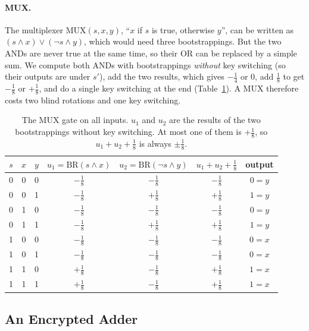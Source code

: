 \documentclass[12pt]{article}
\theoremstyle{plain}
\theoremstyle{definition}
\begin{document}


\paragraph{MUX.}
The multiplexer $\mathrm{MUX}(s,x,y)$, ``$x$ if $s$ is true, otherwise $y$'', can
be written as $(s\wedge x)\vee(\neg s\wedge y)$, which would need three
bootstrappings. But the two ANDs are never true at the same time, so their OR
can be replaced by a simple sum. We compute both ANDs with bootstrappings
\emph{without} key switching (so their outputs are under $s'$), add the two
results, which gives $-\frac14$ or $0$, add $\frac18$ to get $-\frac18$ or
$+\frac18$, and do a single key switching at the end (Table~\ref{tab:mux}). A
MUX therefore costs two blind rotations and one key switching.

\begin{table}[!htb]
\centering
\caption{The MUX gate on all inputs. $u_1$ and $u_2$ are the results of the two
bootstrappings without key switching. At most one of them is $+\frac18$, so
$u_1+u_2+\frac18$ is always $\pm\frac18$.}
\label{tab:mux}
\small
\renewcommand{\arraystretch}{1.35}
\begin{tabular}{@{}ccc@{\qquad}cc@{\qquad}cc@{}}
\toprule
$s$ & $x$ & $y$ & $u_1=\mathrm{BR}(s\wedge x)$ & $u_2=\mathrm{BR}(\neg s\wedge y)$
  & $u_1+u_2+\frac18$ & output\\
\midrule
0 & 0 & 0 & $-\frac18$ & $-\frac18$ & $-\frac18$ & $0=y$\\
0 & 0 & 1 & $-\frac18$ & $+\frac18$ & $+\frac18$ & $1=y$\\
0 & 1 & 0 & $-\frac18$ & $-\frac18$ & $-\frac18$ & $0=y$\\
0 & 1 & 1 & $-\frac18$ & $+\frac18$ & $+\frac18$ & $1=y$\\
1 & 0 & 0 & $-\frac18$ & $-\frac18$ & $-\frac18$ & $0=x$\\
1 & 0 & 1 & $-\frac18$ & $-\frac18$ & $-\frac18$ & $0=x$\\
1 & 1 & 0 & $+\frac18$ & $-\frac18$ & $+\frac18$ & $1=x$\\
1 & 1 & 1 & $+\frac18$ & $-\frac18$ & $+\frac18$ & $1=x$\\
\bottomrule
\end{tabular}
\end{table}

\subsection{An Encrypted Adder}
\label{sec:adder}
\end{document}
